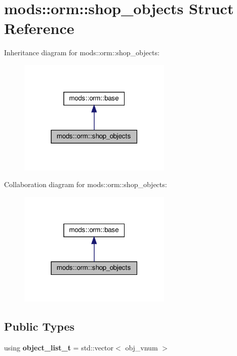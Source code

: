 \hypertarget{structmods_1_1orm_1_1shop__objects}{}\section{mods\+:\+:orm\+:\+:shop\+\_\+objects Struct Reference}
\label{structmods_1_1orm_1_1shop__objects}


Inheritance diagram for mods\+:\+:orm\+:\+:shop\+\_\+objects\+:\nopagebreak
\begin{figure}[H]
\begin{center}
\leavevmode
\includegraphics[width=207pt]{structmods_1_1orm_1_1shop__objects__inherit__graph}
\end{center}
\end{figure}


Collaboration diagram for mods\+:\+:orm\+:\+:shop\+\_\+objects\+:\nopagebreak
\begin{figure}[H]
\begin{center}
\leavevmode
\includegraphics[width=207pt]{structmods_1_1orm_1_1shop__objects__coll__graph}
\end{center}
\end{figure}
\subsection*{Public Types}
\begin{DoxyCompactItemize}
\item 
\mbox{\label{structmods_1_1orm_1_1shop__objects_a5d1db2b7f5c2d7a6cdde924d41c75016}} 
using {\bfseries object\+\_\+list\+\_\+t} = std\+::vector$<$ obj\+\_\+vnum $>$
\end{DoxyCompactItemize}
